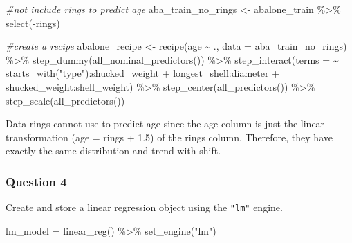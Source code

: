 \documentclass[
]{article}
\newenvironment{Shaded}{\begin{snugshade}}{\end{snugshade}}
\newcommand{\AttributeTok}[1]{\textcolor[rgb]{0.77,0.63,0.00}{#1}}
\newcommand{\CommentTok}[1]{\textcolor[rgb]{0.56,0.35,0.01}{\textit{#1}}}
\newcommand{\FunctionTok}[1]{\textcolor[rgb]{0.00,0.00,0.00}{#1}}
\newcommand{\NormalTok}[1]{#1}
\newcommand{\OtherTok}[1]{\textcolor[rgb]{0.56,0.35,0.01}{#1}}
\newcommand{\SpecialCharTok}[1]{\textcolor[rgb]{0.00,0.00,0.00}{#1}}
\newcommand{\StringTok}[1]{\textcolor[rgb]{0.31,0.60,0.02}{#1}}
\begin{document}
\begin{Shaded}
\begin{Highlighting}[]
\CommentTok{\#not include \textasciigrave{}rings\textasciigrave{} to predict \textasciigrave{}age\textasciigrave{}}
\NormalTok{aba\_train\_no\_rings }\OtherTok{\textless{}{-}}\NormalTok{ abalone\_train }\SpecialCharTok{\%\textgreater{}\%}
  \FunctionTok{select}\NormalTok{(}\SpecialCharTok{{-}}\NormalTok{rings)}

\CommentTok{\#create a recipe}
\NormalTok{abalone\_recipe }\OtherTok{\textless{}{-}} \FunctionTok{recipe}\NormalTok{(age }\SpecialCharTok{\textasciitilde{}}\NormalTok{ ., }\AttributeTok{data =}\NormalTok{ aba\_train\_no\_rings) }\SpecialCharTok{\%\textgreater{}\%}
  \FunctionTok{step\_dummy}\NormalTok{(}\FunctionTok{all\_nominal\_predictors}\NormalTok{()) }\SpecialCharTok{\%\textgreater{}\%}
  \FunctionTok{step\_interact}\NormalTok{(}\AttributeTok{terms =} \SpecialCharTok{\textasciitilde{}} \FunctionTok{starts\_with}\NormalTok{(}\StringTok{"type"}\NormalTok{)}\SpecialCharTok{:}\NormalTok{shucked\_weight }\SpecialCharTok{+}
\NormalTok{                  longest\_shell}\SpecialCharTok{:}\NormalTok{diameter }\SpecialCharTok{+}
\NormalTok{                  shucked\_weight}\SpecialCharTok{:}\NormalTok{shell\_weight) }\SpecialCharTok{\%\textgreater{}\%}
  \FunctionTok{step\_center}\NormalTok{(}\FunctionTok{all\_predictors}\NormalTok{()) }\SpecialCharTok{\%\textgreater{}\%}
  \FunctionTok{step\_scale}\NormalTok{(}\FunctionTok{all\_predictors}\NormalTok{())}
\end{Highlighting}
\end{Shaded}

Data rings cannot use to predict age since the age column is just the
linear transformation (age = rings + 1.5) of the rings column.
Therefore, they have exactly the same distribution and trend with shift.

\hypertarget{question-4}{%
\subsubsection{Question 4}\label{question-4}}

Create and store a linear regression object using the \texttt{"lm"}
engine.

\begin{Shaded}
\begin{Highlighting}[]
\NormalTok{lm\_model }\OtherTok{=} \FunctionTok{linear\_reg}\NormalTok{() }\SpecialCharTok{\%\textgreater{}\%}
  \FunctionTok{set\_engine}\NormalTok{(}\StringTok{"lm"}\NormalTok{)}
\end{Highlighting}
\end{Shaded}
\end{document}
